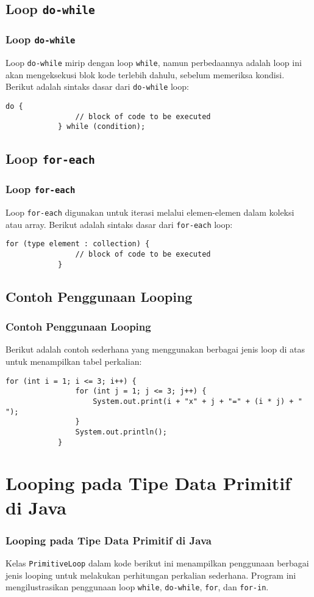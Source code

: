 \documentclass[aspectratio=169, table]{beamer}
\begin{document}
	\subsection{Loop \texttt{do-while}}
	\begin{frame}[fragile]
		\frametitle{Loop \texttt{do-while}}
		Loop \texttt{do-while} mirip dengan loop \texttt{while}, namun perbedaannya adalah loop ini akan mengeksekusi blok kode terlebih dahulu, sebelum memeriksa kondisi. Berikut adalah sintaks dasar dari \texttt{do-while} loop:
		\begin{lstlisting}[style=JavaStyle]
			do {
				// block of code to be executed
			} while (condition);
		\end{lstlisting}
	\end{frame}
	
	\subsection{Loop \texttt{for-each}}
	\begin{frame}[fragile]
		\frametitle{Loop \texttt{for-each}}
		Loop \texttt{for-each} digunakan untuk iterasi melalui elemen-elemen dalam koleksi atau array. Berikut adalah sintaks dasar dari \texttt{for-each} loop:
		\begin{lstlisting}[style=JavaStyle]
			for (type element : collection) {
				// block of code to be executed
			}
		\end{lstlisting}
	\end{frame}
	
	\subsection{Contoh Penggunaan Looping}
	\begin{frame}[fragile]
		\frametitle{Contoh Penggunaan Looping}
		Berikut adalah contoh sederhana yang menggunakan berbagai jenis loop di atas untuk menampilkan tabel perkalian:
		\begin{lstlisting}[style=JavaStyle]
			for (int i = 1; i <= 3; i++) {
				for (int j = 1; j <= 3; j++) {
					System.out.print(i + "x" + j + "=" + (i * j) + " ");
				}
				System.out.println();
			}
		\end{lstlisting}
	\end{frame}
	
	\section{Looping pada Tipe Data Primitif di Java}
	\begin{frame}
		\frametitle{Looping pada Tipe Data Primitif di Java}
		Kelas \texttt{PrimitiveLoop} dalam kode berikut ini menampilkan penggunaan berbagai jenis looping untuk melakukan perhitungan perkalian sederhana. Program ini mengilustrasikan penggunaan loop \texttt{while}, \texttt{do-while}, \texttt{for}, dan \texttt{for-in}.
	\end{frame}
	
\end{document}
